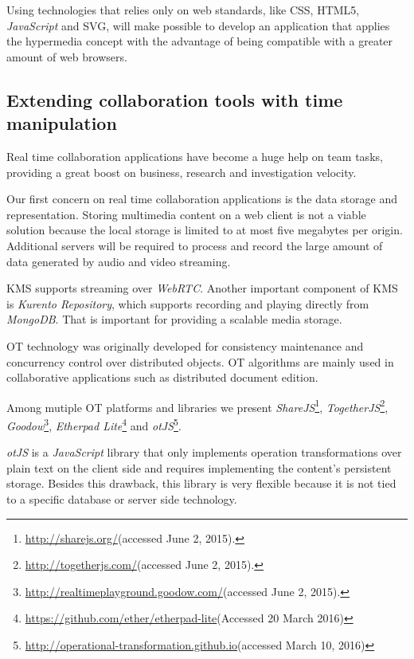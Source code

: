 \documentclass[conference,compsoc,a4paper]{IEEEtran}
\begin{document}
  Using technologies that relies only on web standards, like \gls{CSS}, \gls{HTML}5, \emph{JavaScript} and \gls{SVG}, will make possible to develop an application that applies the hypermedia concept with the advantage of being compatible with a greater amount of web browsers.
  
\subsection{Extending collaboration tools with time manipulation}
\label{collab}

Real time collaboration applications have become a huge help on team tasks, providing a great boost on business, research and investigation velocity.

 Our first concern on real time collaboration applications is the data storage and representation. Storing multimedia content on a web client is not a viable solution because the local storage is limited to at most five megabytes per origin. Additional servers will be required to process and record the large amount of data generated by audio and video streaming.
 
\gls{KMS} supports streaming over \emph{WebRTC}. Another important component of \gls{KMS} is \emph{Kurento Repository}, which supports recording and playing directly from \emph{MongoDB}. That is important for providing a scalable media storage. 
	
     \gls{OT} technology was originally developed for consistency maintenance and concurrency control over distributed objects.
     \gls{OT} algorithms are mainly used in collaborative applications such as distributed document edition.

	Among mutiple \gls{OT} platforms and libraries we present \emph{ShareJS}\footnote{\url{http://sharejs.org/}(accessed June 2, 2015).}, \emph{TogetherJS}\footnote{\url{http://togetherjs.com/}(accessed June 2, 2015).}, \emph{Goodow}\footnote{\url{http://realtimeplayground.goodow.com/}(accessed June 2, 2015).}, \emph{Etherpad Lite}\footnote{\url{https://github.com/ether/etherpad-lite}(Accessed 20 March 2016)} and \emph{otJS}\footnote{\url{http://operational-transformation.github.io}(accessed March 10, 2016)}.


	\emph{otJS} is a \emph{JavaScript} library that only implements operation transformations over plain text on the client side and requires implementing the content's persistent storage. Besides this drawback, this library is very flexible because it is not tied to a specific database or server side technology.
        
\end{document}
